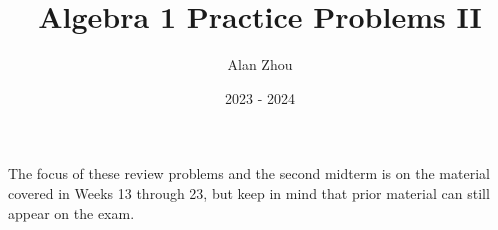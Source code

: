 \documentclass{article}
\title{Algebra 1 Practice Problems II}
\author{Alan Zhou}
\date{2023 - 2024}
\begin{document}
\maketitle

The focus of these review problems and the second midterm is on the material covered in Weeks 13 through 23, but keep in mind that prior material can still appear on the exam.

\tableofcontents



\end{document}
